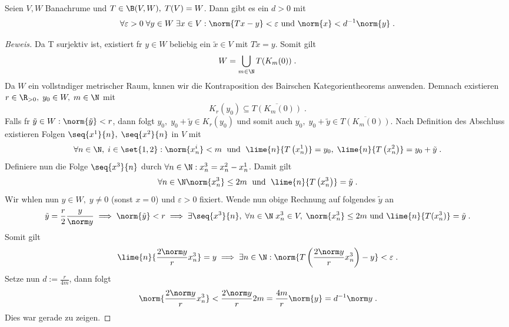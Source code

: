 \begin{theorem}
\begin{lemma}
	Seien \(V,W\) Banachr\as ume und \(T\in \B(V,W),\;T(V) = W\). Dann gibt es ein \(d> 0\) mit 
	\[\forall \varepsilon > 0 \;\forall y\in W \;\exists x \in V: \norm{Tx-y} < \varepsilon \text{ und } \norm{x} < d^{-1}\norm{y}\;.\]
	\label{lemma1_Offene_Abb}
\end{lemma}
\begin{proof}[Beweis]
	Da T surjektiv ist, existiert f\us r \(y\in W\) beliebig ein \(\tilde x \in V\) mit \(T\tilde x = y\). Somit gilt
	\[W = \bigcup_{m\in \N} T(K_m(0))\;.\] 
	Da $W$ ein vollst\as ndiger metrischer Raum, k\os nnen wir die Kontraposition des Bairschen Kategorientheorems anwenden. Demnach existieren \(r\in \R_{>0},\;y_0 \in  W,\; m\in\N\) mit 
	\[K_r(y_0) \subseteq \overline{T(K_m(0))}\;.\]
	Falls f\us r \(\tilde y \in W: \norm{\tilde y}<r\), dann folgt \(y_0,\;y_0 + \tilde y \in K_r(y_0)\) und somit auch \(y_0,\;y_0 + \tilde y \in \overline{T(K_m(0))}\). Nach Definition des Abschluss existieren Folgen \(\seq{x^1}{n}, \;\seq{x^2}{n}\) in $V$ mit
	\[\forall n\in \N, \;i\in\set{1,2}: \norm{x^i_n}< m \;\text{ und }\; \lime{n}{T\left(x^1_n\right)} = y_0,\; \lime{n}{T\left(x^2_n\right)} = y_0 + \tilde y\;.\]
	Definiere nun die Folge \(\seq{x^3}{n}\) durch \(\forall n \in \N: x^3_n = x^2_n - x^1_n\). Damit gilt
	\[\forall n \in \N \norm{x^3_n} \leq 2m \;\text{ und }\; \lime{n}{T\left(x^3_n\right)} = \tilde y\;.\]
	Wir w\as hlen nun \(y\in W,\; y \neq 0\) (sonst \(x=0\)) und \(\varepsilon > 0\) fixiert. Wende nun obige Rechnung auf folgendes \(\tilde y\) an
	\[\tilde y = \frac{r}{2} \frac{y}{\norm y} \implies \norm{\tilde y} < r \implies \exists \seq{x^3}{n},\;\forall n\in \N\; x^3_n\in V,\; \norm{x^3_n} \leq 2m \text{ und }\lime{n}{T(x^3_n)} = \tilde y\;.\]
	Somit gilt 
	\[\lime{n}{\frac{2\norm y}{r} x^3_n} = y \implies \exists n\in \N: \norm{T\left(\frac{2\norm y}{r} x^3_n\right)-y}< \varepsilon\;.\]
	Setze nun \(d:=\frac{r}{4m}\), dann folgt
	\[\norm{\frac{2\norm y}{r} x^3_n} < \frac{2\norm y}{r} 2m = \frac{4m}r \norm{y} = d^{-1} \norm y\;.\]
	Dies war gerade zu zeigen.
\end{proof}


\end{theorem}
